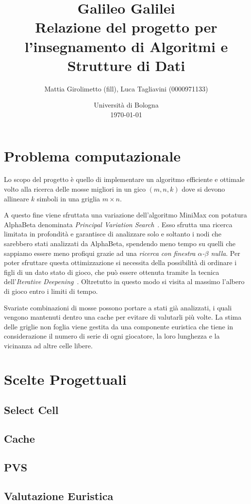 \documentclass{article}
\title{Galileo Galilei \\
\large Relazione del progetto per l'insegnamento di Algoritmi e Strutture di Dati}
\author{
  Mattia Girolimetto (fill),
  Luca Tagliavini (0000971133)
}
\date{
	Universit\`a di Bologna \\
  \today
}
\begin{document}
\maketitle

\section{Problema computazionale}

Lo scopo del progetto \`e quello di implementare un algoritmo efficiente e ottimale
volto alla ricerca delle mosse migliori in un gico $(m,n,k)$ dove si devono
allineare $k$ simboli in una griglia $m \times n$.

A questo fine viene sfruttata una variazione dell'algoritmo MiniMax con potatura
AlphaBeta denominata \emph{Principal Variation Search}~\cite{negascout}. Esso
sfrutta una ricerca limitata in profondit\`a e garantisce di analizzare solo e soltanto
i nodi che sarebbero stati analizzati da AlphaBeta, spendendo meno tempo su
quelli che sappiamo essere meno profiqui grazie ad una \emph{ricerca con finestra $\alpha$-$\beta$ nulla}.
Per poter sfruttare questa ottimizzazione si necessita della possibilit\`a di ordinare i
figli di un dato stato di gioco, che pu\`o essere ottenuta tramite la tecnica
dell'\emph{Iterative Deepening}~\cite{id}. Oltretutto in questo modo si visita al
massimo l'albero di gioco entro i limiti di tempo.

Svariate combinazioni di mosse possono portare a stati gi\`a analizzati, i quali
vengono mantenuti dentro una cache per evitare di valutarli pi\`u volte.
La stima delle griglie non foglia viene gestita da una componente euristica che
tiene in considerazione il numero di serie di ogni giocatore, la loro lunghezza
e la vicinanza ad altre celle libere.

\section{Scelte Progettuali}

\subsection{Select Cell}
\subsection{Cache}
\subsection{PVS}
\subsection{Valutazione Euristica}

\pagebreak


\end{document}

